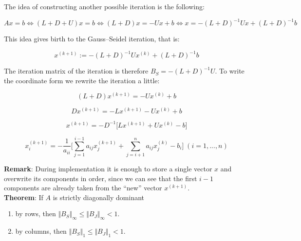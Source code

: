 \documentclass[margin=0px]{article}
\begin{document}
\noindent The idea of constructing another possible iteration is the following:

\begin{displaymath}
    Ax = b \Longleftrightarrow (L + D + U)x = b \Longleftrightarrow (L+D)x = -Ux+b \Longleftrightarrow
    x = -(L+D)^{-1}Ux + (L+D)^{-1}b
\end{displaymath}

\noindent This idea gives birth to the Gauss--Seidel iteration, that is:

\begin{displaymath}
    x^{(k+1)} :=  -(L+D)^{-1}Ux^{(k)} + (L+D)^{-1}b
\end{displaymath}

The iteration matrix of the iteration is therefore $B_{S} = -(L+D)^{-1}U$. To write the coordinate form we rewrite
the iteration a little:

\begin{displaymath}
    (L+D)x^{(k+1)} = -Ux^{(k)} + b
\end{displaymath}

\begin{displaymath}
    Dx^{(k+1)} = -Lx^{(k+1)} - Ux^{(k)} + b
\end{displaymath}

\begin{displaymath}
    x^{(k+1)} = -D^{-1} \big[Lx^{(k+1)} + Ux^{(k)} - b \big]
\end{displaymath}

\begin{displaymath}
    x^{(k+1)}_{i} =
    -\frac{1}{a_{ii}}
    \Bigg[
    \sum_{j=1}^{i-1} a_{ij}x_{j}^{(k+1)} +
    \sum_{j=i+1}^{n} a_{ij}x_{j}^{(k)}	-
    b_{i}
    \Bigg]
    \; (i = 1, ..., n)
\end{displaymath}

\noindent \textbf{Remark}: During implementation it is enough to store a single vector $x$ and overwrite its components in order, since
we can see that the first $i-1$ components are already taken from the ``new'' vector $x^{(k+1)}$.\\

\noindent \textbf{Theorem}: If $A$ is strictly diagonally dominant
\begin{enumerate}
    \item	by rows, then
          $\Vert B_{S} \Vert_{\infty} \leq \Vert B_{J} \Vert_{\infty} < 1$.

    \item  by columns, then
          $\Vert B_{S} \Vert_{1} \leq \Vert B_{J} \Vert_{1} < 1$.
\end{enumerate}
\end{document}
